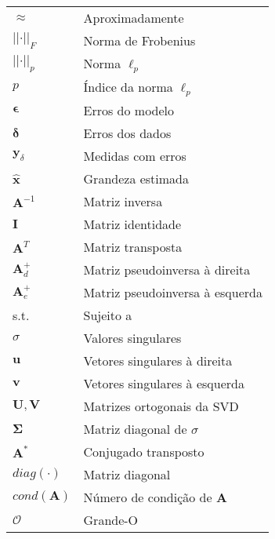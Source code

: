 \begin{multicols}{2}
\noindent\begin{tabular}{ m{1.3cm} m{6.2cm}}
$\approx$ & Aproximadamente  \\
$\vert\vert \cdot \vert \vert_F$ & Norma de Frobenius \\
$\vert\vert \cdot \vert \vert_p$ & Norma $\ell_p$ \\
$p$ & Índice da norma $\ell_p$\\
$\bm{\epsilon}$ &Erros do modelo \\
$\bm{\delta}$ &Erros dos dados \\
$\mathbf{y}_{\delta}$ &Medidas com erros  \\
$\hat{\mathbf{x}}$ &Grandeza estimada \\
$\mathbf{A}^{-1}$ & Matriz inversa  \\
$\mathbf{I}$ &Matriz identidade   \\
$\mathbf{A}^T$ & Matriz transposta  \\
$\mathbf{A}^+_d$ &Matriz pseudoinversa à direita  \\
$\mathbf{A}^+_e$ &Matriz pseudoinversa à esquerda  \\
s.t. &Sujeito a  \\
$\sigma$ &Valores singulares  \\
$\mathbf{u}$ &Vetores singulares à direita \\
$\mathbf{v}$ &Vetores singulares à esquerda  \\ 
$\mathbf{U}, \mathbf{V} $ & Matrizes ortogonais da SVD  \\
$ \mathbf{\Sigma}$& Matriz diagonal de $\sigma$   \\
$\mathbf{A}^*$ & Conjugado transposto  \\
$diag(\cdot)$ & Matriz diagonal \\
$cond(\mathbf{A})$ & Número de condição de $\mathbf{A}$ \\
$\mathcal{O}$ & Grande-O \\
\end{tabular}

\newpage


\end{multicols}
